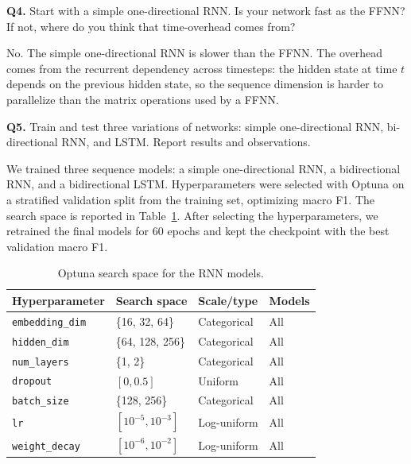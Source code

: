 \begin{questionbox}
\textbf{Q4.} Start with a simple one-directional RNN. Is your network fast as the FFNN? If not,
where do you think that time-overhead comes from?
\end{questionbox}

No. The simple one-directional RNN is slower than the FFNN. The overhead comes from the recurrent
dependency across timesteps: the hidden state at time $t$ depends on the previous hidden state, so the
sequence dimension is harder to parallelize than the matrix operations used by a FFNN.

\begin{questionbox}
\textbf{Q5.} Train and test three variations of networks: simple one-directional RNN,
bi-directional RNN, and LSTM. Report results and observations.
\end{questionbox}

We trained three sequence models: a simple one-directional RNN, a bidirectional RNN, and a
bidirectional LSTM. Hyperparameters were selected with Optuna on a stratified validation split from
the training set, optimizing macro F1. The search space is reported in
Table~\ref{tab:task3_optuna_space}. After selecting the hyperparameters, we retrained the final
models for 60 epochs and kept the checkpoint with the best validation macro F1.

\begin{table}[h!]
\centering
\begin{tabular}{llll}
\hline
\textbf{Hyperparameter} & \textbf{Search space} & \textbf{Scale/type} & \textbf{Models} \\
\hline
\texttt{embedding\_dim} & \{16, 32, 64\} & Categorical & All \\
\texttt{hidden\_dim} & \{64, 128, 256\} & Categorical & All \\
\texttt{num\_layers} & \{1, 2\} & Categorical & All \\
\texttt{dropout} & $[0, 0.5]$ & Uniform & All \\
\texttt{batch\_size} & \{128, 256\} & Categorical & All \\
\texttt{lr} & $[10^{-5}, 10^{-3}]$ & Log-uniform & All \\
\texttt{weight\_decay} & $[10^{-6}, 10^{-2}]$ & Log-uniform & All \\
\hline
\end{tabular}
\caption{Optuna search space for the RNN models.}
\label{tab:task3_optuna_space}
\end{table}

